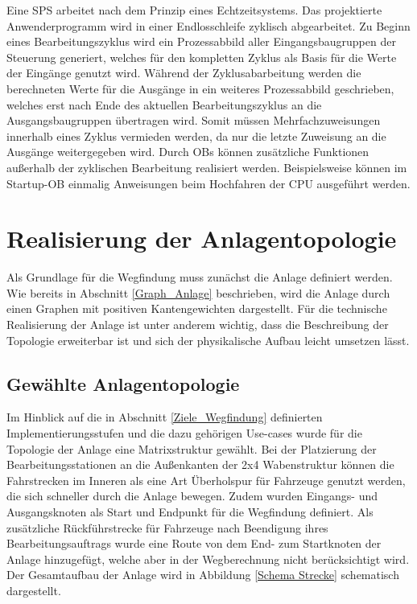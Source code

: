 			Eine \acl{SPS} arbeitet nach dem Prinzip eines Echtzeitsystems. Das projektierte Anwenderprogramm wird in einer Endlosschleife zyklisch abgearbeitet. Zu Beginn eines Bearbeitungszyklus wird ein Prozessabbild aller Eingangsbaugruppen  der Steuerung generiert, welches für den kompletten Zyklus als Basis für die Werte der Eingänge genutzt wird. Während der Zyklusabarbeitung werden die berechneten Werte für die Ausgänge in ein weiteres Prozessabbild geschrieben, welches erst nach Ende des aktuellen Bearbeitungszyklus an die Ausgangsbaugruppen übertragen wird. Somit müssen Mehrfachzuweisungen innerhalb eines Zyklus vermieden werden, da nur die letzte Zuweisung an die Ausgänge weitergegeben wird. Durch \ac{OB}s können zusätzliche Funktionen außerhalb der zyklischen Bearbeitung realisiert werden. Beispielsweise können im Startup-\ac{OB} einmalig Anweisungen beim Hochfahren der CPU ausgeführt werden.
	
	\section{Realisierung der Anlagentopologie}
		
		Als Grundlage für die Wegfindung muss zunächst die Anlage definiert werden. Wie bereits in Abschnitt \ref{Graph_Anlage} beschrieben, wird die Anlage durch einen Graphen mit positiven Kantengewichten dargestellt. Für die technische Realisierung der Anlage ist unter anderem wichtig, dass die Beschreibung der Topologie erweiterbar ist und sich der physikalische Aufbau leicht umsetzen lässt.
		
		\subsection{Gewählte Anlagentopologie}
			
			Im Hinblick auf die in Abschnitt \ref{Ziele_Wegfindung} definierten Implementierungsstufen und die dazu gehörigen Use-cases wurde für die Topologie der Anlage eine Matrixstruktur gewählt.  Bei der Platzierung der Bearbeitungsstationen an die Außenkanten der 2x4 Wabenstruktur können die Fahrstrecken im Inneren als eine Art Überholspur für Fahrzeuge genutzt werden, die sich schneller durch die Anlage bewegen. Zudem wurden Eingangs- und Ausgangsknoten als Start und Endpunkt für die Wegfindung definiert. Als zusätzliche Rückführstrecke für Fahrzeuge nach Beendigung ihres Bearbeitungsauftrags wurde eine Route von dem End- zum Startknoten der Anlage hinzugefügt, welche aber in der Wegberechnung nicht berücksichtigt wird. Der Gesamtaufbau der Anlage wird in Abbildung \ref{Schema Strecke} schematisch dargestellt.
			
